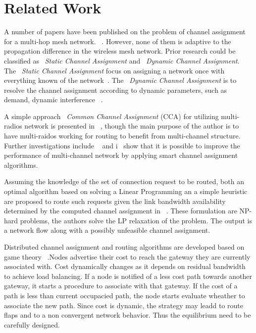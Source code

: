 \section{Related Work}
\label{sec:related}

A number of papers have been published on the problem of channel assignment for a multi-hop mesh network. ~\cite{jain2005impact,akyildiz2005wireless,raniwala2004centralized}. 
However, none of them is adaptive to the propagation difference in the wireless mesh network.
Prior research could be classified as ~\emph{Static Channel Assignment} and ~\emph{Dynamic Channel Assignment}.
The ~\emph{Static Channel Assignment} focus on assigning a network once with everything known of the network~\cite{subramanian2008minimum}.
The ~\emph{Dynamic Channel Assignment} is to resolve the channel assignment according to dynamic parameters, such as demand, dynamic interference ~\cite{wu2006analysis,ramachandran2006interference}.

A simple approach ~\emph{Common Channel Assignment} (CCA) for utilizing multi-radios network is
presented in ~\cite{draves2004routing}, though the main purpose of the author is to have multi-raidos working for routing
to benefit from multi-channel structure. 
Further investigations include ~\cite{marina2010topology} and i~\cite{raniwala2004centralized} show that it is possible to improve the performance of multi-channel network by applying smart channel assignment algorithms. 


Assuming the knowledge of the set of connection request to be routed, both an optimal algorithm based on solving a Linear Programming an a simple heuristic are proposed to route such requests given the link bandwidth availability determined by the computed channel assignment in ~\cite{tang2005interference}. 
These formulation are NP-hard problems, the authors solve the LP relaxation of the problem. The output is a network flow along with a possibly unfeasible channel assignment. 
 

Distributed channel assignment and routing algorithms are developed based on game theory ~\cite{raniwala2005architecture,wang2010game}.Nodes advertise their cost to reach the gateway they are currently associated with.
Cost dynamically changes as it depends on residual bandwidth to achieve load balancing. If a node is notified of a less cost path towards another gateway, it starts a procedure to associate with that gateway. If the cost of a path is less than current occupacied path, the node starts evaluate wheather to associate the new path. 
Since cost is dynamic, the strategy may leadd to route flaps and to a non convergent network behavior. Thus the equilibrium need to be carefully designed.



